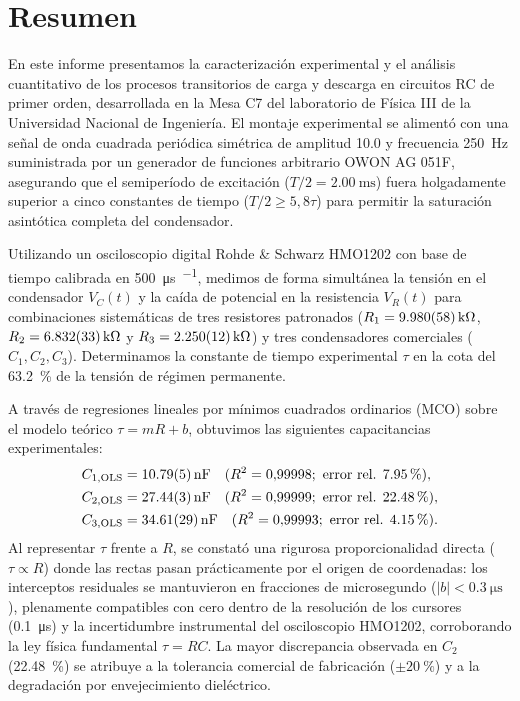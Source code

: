 
\section{Resumen}
\label{sec:resumen}

En este informe presentamos la caracterización experimental y el análisis cuantitativo de los procesos transitorios de carga y descarga en circuitos RC de primer orden, desarrollada en la Mesa C7 del laboratorio de Física III de la Universidad Nacional de Ingeniería. El montaje experimental se alimentó con una señal de onda cuadrada periódica simétrica de amplitud \qty{10,0}{\voltpp} y frecuencia \qty{250}{\hertz} suministrada por un generador de funciones arbitrario OWON AG 051F, asegurando que el semiperíodo de excitación ($T/2 = \qty{2,00}{\milli\second}$) fuera holgadamente superior a cinco constantes de tiempo ($T/2 \ge 5{,}8\tau$) para permitir la saturación asintótica completa del condensador.

Utilizando un osciloscopio digital Rohde \& Schwarz HMO1202 con base de tiempo calibrada en \qty{500}{\micro\second\per\division}, medimos de forma simultánea la tensión en el condensador $V_C(t)$ y la caída de potencial en la resistencia $V_R(t)$ para combinaciones sistemáticas de tres resistores patronados ($R_1 = \qty{9,980 \pm 0,058}{\kilo\ohm}$, $R_2 = \qty{6,832 \pm 0,033}{\kilo\ohm}$ y $R_3 = \qty{2,250 \pm 0,012}{\kilo\ohm}$) y tres condensadores comerciales ($C_1, C_2, C_3$). Determinamos la constante de tiempo experimental $\tau$ en la cota del \qty{63,2}{\percent} de la tensión de régimen permanente. 

A través de regresiones lineales por mínimos cuadrados ordinarios (MCO) sobre el modelo teórico $\tau = m R + b$, obtuvimos las siguientes capacitancias experimentales:
\begin{align*}
    C_{1,\text{OLS}} &= \qty{10,79 \pm 0,05}{\nano\farad} \quad (R^2 = 0{,}99998; \text{ error rel. } \qty{+7,95}{\percent}), \\
    C_{2,\text{OLS}} &= \qty{27,44 \pm 0,03}{\nano\farad} \quad (R^2 = 0{,}99999; \text{ error rel. } \qty{+22,48}{\percent}), \\
    C_{3,\text{OLS}} &= \qty{34,61 \pm 0,29}{\nano\farad} \quad (R^2 = 0{,}99993; \text{ error rel. } \qty{+4,15}{\percent}).
\end{align*}
Al representar $\tau$ frente a $R$, se constató una rigurosa proporcionalidad directa ($\tau \propto R$) donde las rectas pasan prácticamente por el origen de coordenadas: los interceptos residuales se mantuvieron en fracciones de microsegundo ($|b| < \qty{0,3}{\micro\second}$), plenamente compatibles con cero dentro de la resolución de los cursores (\qty{0,1}{\micro\second}) y la incertidumbre instrumental del osciloscopio HMO1202, corroborando la ley física fundamental $\tau = RC$. La mayor discrepancia observada en $C_2$ (\qty{+22,48}{\percent}) se atribuye a la tolerancia comercial de fabricación ($\pm\qty{20}{\percent}$) y a la degradación por envejecimiento dieléctrico.

